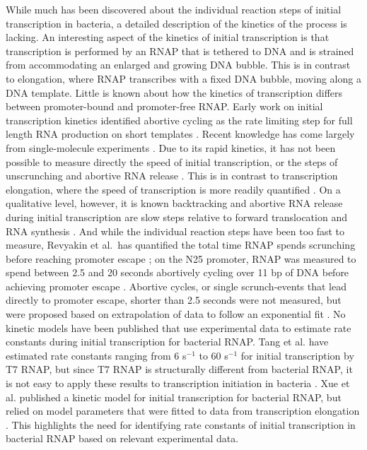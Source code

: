 While much has been discovered about the individual reaction steps of initial
transcription in bacteria, a detailed description of the kinetics of the
process is lacking. An interesting aspect of the kinetics of initial
transcription is that transcription is performed by an RNAP that is tethered to
DNA and is strained from accommodating an enlarged and growing DNA bubble.
This is in contrast to elongation, where RNAP transcribes with a fixed DNA
bubble, moving along a DNA template. Little is known about how the kinetics of
transcription differs between promoter-bound and promoter-free RNAP. Early
work on initial transcription kinetics identified abortive cycling as the rate
limiting step for full length RNA production on short templates
\cite{stefano_lac_1979, munson_abortive_1981}. Recent knowledge has come
largely from single-molecule experiments \cite{revyakin_abortive_2006,
kapanidis_initial_2006, tang_real-time_2009, kapanidis_retention_2005,
margeat_direct_2006}. Due to its rapid kinetics, it has not been possible to
measure directly the speed of initial transcription, or the steps of
unscrunching and abortive RNA release \cite{revyakin_abortive_2006,
margeat_direct_2006}. This is in contrast to transcription elongation, where
the speed of transcription is more readily quantified \cite{wang_force_1998,
tolic-norrelykke_diversity_2004, bai_mechanochemical_2007}. On a qualitative
level, however, it is known backtracking and abortive RNA release during
initial transcription are slow steps relative to forward translocation and RNA
synthesis \cite{revyakin_abortive_2006, margeat_direct_2006}. And while the
individual reaction steps have been too fast to measure, Revyakin et al.\ has
quantified the total time RNAP spends scrunching before reaching promoter
escape \cite{revyakin_abortive_2006}; on the N25 promoter, RNAP was measured
to spend between 2.5 and 20 seconds abortively cycling over 11 bp of DNA before
achieving promoter escape \cite{revyakin_abortive_2006}. Abortive cycles, or
single scrunch-events that lead directly to promoter escape, shorter than 2.5
seconds were not measured, but were proposed based on extrapolation of data to
follow an exponential fit \cite{revyakin_abortive_2006}. No kinetic models
have been published that use experimental data to estimate rate constants
during initial transcription for bacterial RNAP. Tang et al. have estimated
rate constants ranging from 6 s$^{-1}$ to 60 s$^{-1}$ for initial
transcription by T7 RNAP, but since T7 RNAP is structurally different from
bacterial RNAP, it is not easy to apply these results to transcription
initiation in bacteria \cite{tang_real-time_2009}. Xue et al. published a
kinetic model for initial transcription for bacterial RNAP, but relied on
model parameters that were fitted to data from transcription elongation
\cite{xue_kinetic_2008}. This highlights the need for identifying rate
constants of initial transcription in bacterial RNAP based on relevant
experimental data.

